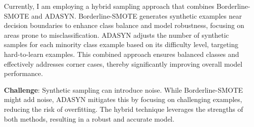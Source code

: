 \begin{tcolorbox}[colback=purple!2!white, colframe=purple]

  Currently, I am employing a hybrid sampling approach that combines Borderline-SMOTE and ADASYN. Borderline-SMOTE generates synthetic examples near decision boundaries to enhance class balance and model robustness, focusing on areas prone to misclassification. ADASYN adjusts the number of synthetic samples for each minority class example based on its difficulty level, targeting hard-to-learn examples. This combined approach ensures balanced classes and effectively addresses corner cases, thereby significantly improving overall model performance.
  
  \textbf{Challenge}: Synthetic sampling can introduce noise. While Borderline-SMOTE might add noise, ADASYN mitigates this by focusing on challenging examples, reducing the risk of overfitting. The hybrid technique leverages the strengths of both methods, resulting in a robust and accurate model.
  
  \end{tcolorbox}



